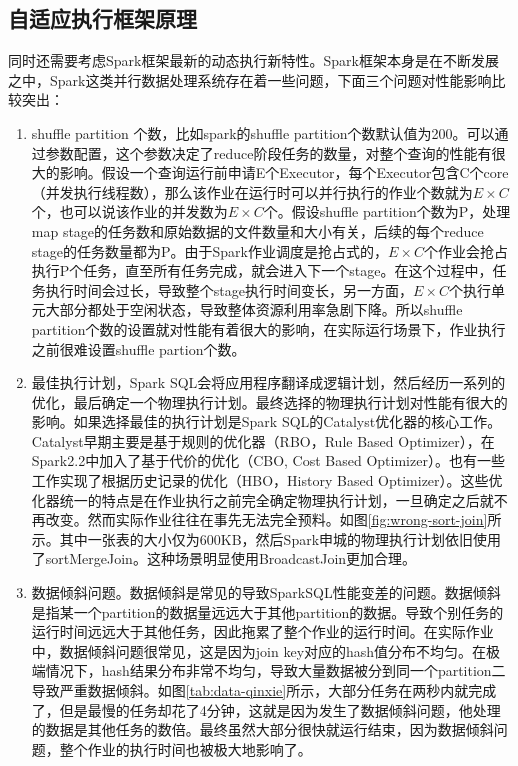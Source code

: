 \subsection{自适应执行框架原理}
同时还需要考虑Spark框架最新的动态执行新特性。Spark框架本身是在不断发展之中，Spark这类并行数据处理系统存在着一些问题，下面三个问题对性能影响比较突出：

\begin{enumerate}
    \item shuffle partition 个数，比如spark的shuffle partition个数默认值为200。可以通过参数配置，这个参数决定了reduce阶段任务的数量，对整个查询的性能有很大的影响。假设一个查询运行前申请E个Executor，每个Executor包含C个core（并发执行线程数），那么该作业在运行时可以并行执行的作业个数就为$E\times C$个，也可以说该作业的并发数为$E\times C$个。假设shuffle partition个数为P，处理map stage的任务数和原始数据的文件数量和大小有关，后续的每个reduce stage的任务数量都为P。由于Spark作业调度是抢占式的，$E\times C$个作业会抢占执行P个任务，直至所有任务完成，就会进入下一个stage。在这个过程中，任务执行时间会过长，导致整个stage执行时间变长，另一方面，$E\times C$个执行单元大部分都处于空闲状态，导致整体资源利用率急剧下降。所以shuffle partition个数的设置就对性能有着很大的影响，在实际运行场景下，作业执行之前很难设置shuffle partion个数。
    \item 最佳执行计划，Spark SQL会将应用程序翻译成逻辑计划，然后经历一系列的优化，最后确定一个物理执行计划。最终选择的物理执行计划对性能有很大的影响。如果选择最佳的执行计划是Spark SQL的Catalyst优化器的核心工作。Catalyst早期主要是基于规则的优化器（RBO，Rule Based Optimizer），在Spark2.2中加入了基于代价的优化（CBO, Cost Based Optimizer）。也有一些工作实现了根据历史记录的优化（HBO，History Based Optimizer）。这些优化器统一的特点是在作业执行之前完全确定物理执行计划，一旦确定之后就不再改变。然而实际作业往往在事先无法完全预料。如图\ref{fig:wrong-sort-join}所示。其中一张表的大小仅为600KB，然后Spark申城的物理执行计划依旧使用了sortMergeJoin。这种场景明显使用BroadcastJoin更加合理。
    \item 数据倾斜问题。数据倾斜是常见的导致SparkSQL性能变差的问题。数据倾斜是指某一个partition的数据量远远大于其他partition的数据。导致个别任务的运行时间远远大于其他任务，因此拖累了整个作业的运行时间。在实际作业中，数据倾斜问题很常见，这是因为join key对应的hash值分布不均匀。在极端情况下，hash结果分布非常不均匀，导致大量数据被分到同一个partition二导致严重数据倾斜。如图\ref{tab:data-qinxie}所示，大部分任务在两秒内就完成了，但是最慢的任务却花了4分钟，这就是因为发生了数据倾斜问题，他处理的数据是其他任务的数倍。最终虽然大部分很快就运行结束，因为数据倾斜问题，整个作业的执行时间也被极大地影响了。

\end{enumerate}

